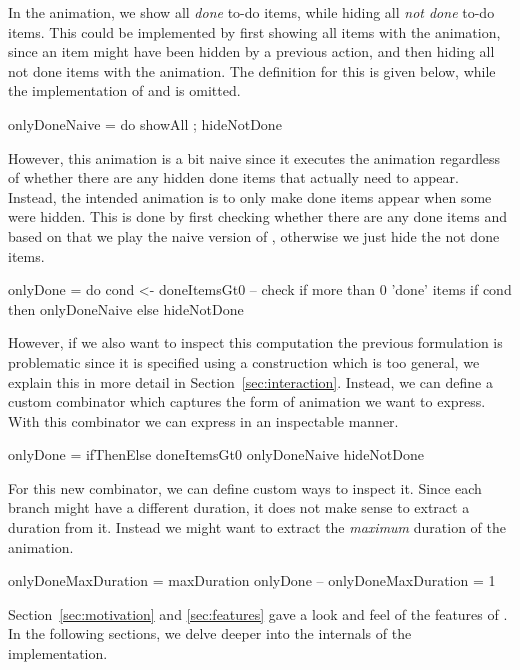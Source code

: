In the  animation, we show all \emph{done} to-do items, while hiding all \emph{not done} to-do items. This could be implemented by first showing all items with the  animation, since an item might have been hidden by a previous action, and then hiding all not done items with the  animation. The definition for this is given below, while the implementation of  and  is omitted.

\begin{spec}
onlyDoneNaive = do showAll ; hideNotDone
\end{spec}

However, this animation is a bit naive since it executes the  animation regardless of whether there are any hidden done items that actually need to appear. Instead, the intended animation is to only make done items appear when some were hidden. This is done by first checking whether there are any done items and based on that we play the naive version of , otherwise we just hide the not done items.

\begin{spec}
onlyDone = do
  cond <- doneItemsGt0    -- check if more than 0 'done' items
  if cond then onlyDoneNaive else hideNotDone
\end{spec}

However, if we also want to inspect this computation the previous formulation is problematic since it is specified using a construction which is too general, we explain this in more detail in Section~\ref{sec:interaction}. Instead, we can define a custom combinator  which captures the form of animation we want to express. With this combinator we can express  in an inspectable manner.

\begin{spec}
onlyDone = ifThenElse doneItemsGt0 onlyDoneNaive hideNotDone
\end{spec}

For this new combinator, we can define custom ways to inspect it. Since each branch might have a different duration, it does not make sense to extract a duration from it. Instead we might want to extract the \emph{maximum} duration of the animation.

\begin{spec}
onlyDoneMaxDuration = maxDuration onlyDone
-- onlyDoneMaxDuration = 1
\end{spec}

Section~\ref{sec:motivation} and \ref{sec:features} gave a look and feel of the features of \dsl{}. In the following sections, we delve deeper into the internals of the implementation.
